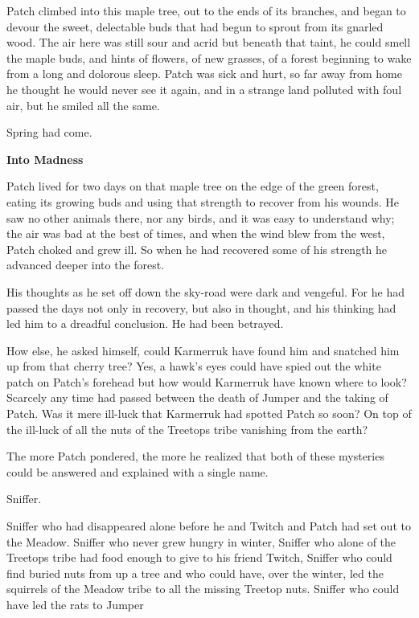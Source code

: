 \documentclass[11pt]{article}
\begin{document}
Patch climbed into this maple tree, out to the ends of its branches, and began to devour the sweet, delectable buds that had begun to sprout from its gnarled wood. The air here was still sour and acrid %
 but beneath that taint, he could smell the maple buds, and hints of flowers, of new grasses, of a forest beginning to wake from a long and dolorous sleep. Patch was sick and hurt, so far away from home he thought he would never see it again, and in a strange land polluted with foul air, but he smiled all the same.\par
Spring had come.\par
\par
{\bf Into Madness\par
}\par
Patch lived for two days on that maple tree on the edge of the green forest, eating its growing buds and using that strength to recover from his wounds. He saw no other animals there, nor any birds, and it was easy to understand why; the air was bad at the best of times, and when the wind blew from the west, Patch choked and grew ill. So when he had recovered some of his strength he advanced deeper into the forest.\par
His thoughts as he set off down the sky-road were dark and vengeful. For he had passed the days not only in recovery, but also in thought, and his thinking had led him to a dreadful conclusion. He had been betrayed.\par
How else, he asked himself, could Karmerruk have found him and snatched him up from that cherry tree? Yes, a hawk's eyes could have spied out the white patch on Patch's forehead %
 but how would Karmerruk have known where to look? Scarcely any time had passed between the death of Jumper and the taking of Patch. Was it mere ill-luck that Karmerruk had spotted Patch so soon? On top of the ill-luck of all the nuts of the Treetops tribe vanishing from the earth?\par
The more Patch pondered, the more he realized that both of these mysteries could be answered and explained with a single name.\par
Sniffer.\par
Sniffer who had disappeared alone before he and Twitch and Patch had set out to the Meadow. Sniffer who never grew hungry in winter, Sniffer who alone of the Treetops tribe had food enough to give to his friend Twitch, Sniffer who could find buried nuts from up a tree %
 and who could have, over the winter, led the squirrels of the Meadow tribe to all the missing Treetop nuts. Sniffer who could have led the rats to Jumper %
\end{document}
